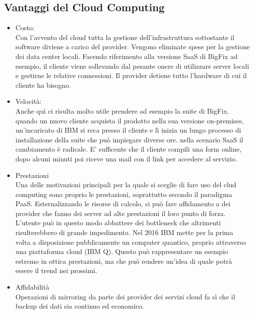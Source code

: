 \subsection{Vantaggi del Cloud Computing}
\begin{itemize}
	\item Costo: \\
	Con l'avvento del cloud tutta la gestione dell'infrastruttura sottostante il software diviene a carico del provider. Vengono eliminate spese per la gestione dei data center locali. Facendo riferimento alla versione SaaS di BigFix ad esempio, il cliente viene sollevando dal pesante onere di utilizzare server locali e gestirne le relative connessioni. Il provider detiene tutto l'hardware di cui il cliente ha bisogno.
	
	\item Velocità: \\
	Anche quì ci risulta molto utile prendere ad esempio la suite di BigFix. quando un nuovo cliente acquista il prodotto nella sua versione on-premises, un'incaricato di IBM si reca presso il cliente e lì inizia un lungo processo di installazione della suite che può impiegare diverse ore. nella scenario SaaS il cambiamento è radicale. E' sufficente che il cliente compili una form online, dopo alcuni minuti poi riceve una mail con il link per accedere al servizio.
	
	\item Prestazioni \\
	Una delle motivazioni principali per la quale si sceglie di fare uso del clud computing sono proprio le prestazioni, soprattutto secondo il paradigma PaaS. Esternalizzando le risorse di calcolo, si può fare affidamento a dei provider che fanno dei server ad alte prestazioni il loro punto di forza. L'utente può in questo modo abbattere dei bottleneck che altrimenti risulterebbero di grande impedimento. Nel 2016 IBM mette per la prima volta a disposizione pubblicamente un computer quantico, proprio attraverso una piattaforma cloud (IBM Q). Questo può rappresentare un esempio estremo in ottica prestazioni, ma che può rendere un'idea di quale potrà essere il trend nei prossimi.
	
	\item Affidabilità \\
	Operazioni di mirroring da parte dei provider dei servizi cloud fa sì che il backup dei dati sia continuo ed economico.
\end{itemize}

